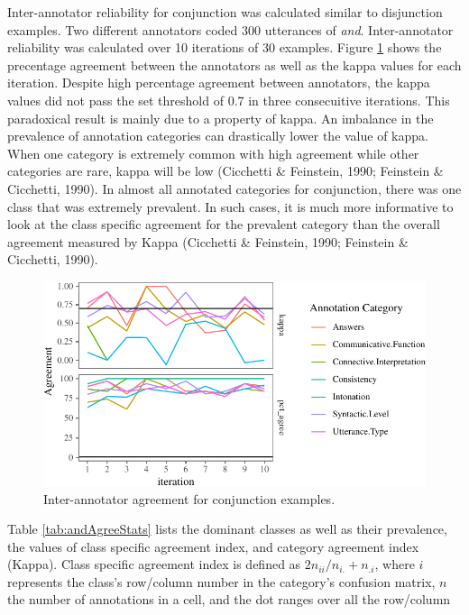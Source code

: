 \documentclass[oneside]{report}
\theoremstyle{definition}
\theoremstyle{definition}
\theoremstyle{definition}
\theoremstyle{remark}
\begin{document}
Inter-annotator reliability for conjunction was calculated similar to
disjunction examples. Two different annotators coded 300 utterances of
\emph{and}. Inter-annotator reliability was calculated over 10
iterations of 30 examples. Figure \ref{fig:andReliabilityPlot} shows the
precentage agreement between the annotators as well as the kappa values
for each iteration. Despite high percentage agreement between
annotators, the kappa values did not pass the set threshold of 0.7 in
three consecuitive iterations. This paradoxical result is mainly due to
a property of kappa. An imbalance in the prevalence of annotation
categories can drastically lower the value of kappa. When one category
is extremely common with high agreement while other categories are rare,
kappa will be low (Cicchetti \& Feinstein, 1990; Feinstein \& Cicchetti,
1990). In almost all annotated categories for conjunction, there was one
class that was extremely prevalent. In such cases, it is much more
informative to look at the class specific agreement for the prevalent
category than the overall agreement measured by Kappa (Cicchetti \&
Feinstein, 1990; Feinstein \& Cicchetti, 1990).
\begin{figure}[tb]

{\centering \includegraphics{figs/andReliabilityPlot-1} 

}

\caption{Inter-annotator agreement for conjunction examples.}\label{fig:andReliabilityPlot}
\end{figure}
Table \ref{tab:andAgreeStats} lists the dominant classes as well as
their prevalence, the values of class specific agreement index, and
category agreement index (Kappa). Class specific agreement index is
defined as \(2n_{ii}/n_{i.}+n_{.i}\), where \(i\) represents the class's
row/column number in the category's confusion matrix, \(n\) the number
of annotations in a cell, and the dot ranges over all the row/column
\end{document}
